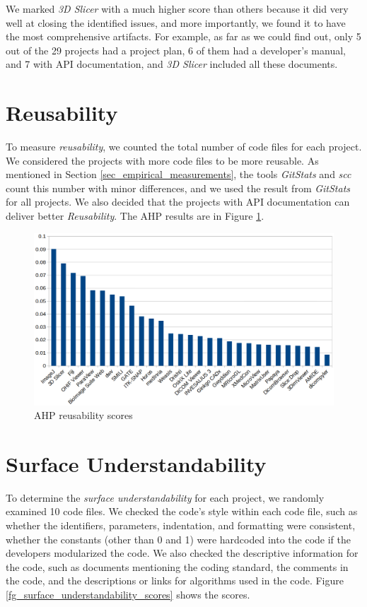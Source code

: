 We marked \textit{3D Slicer} with a much higher score than others because it did very well at closing the identified issues, and more importantly, we found it to have the most comprehensive artifacts. For example, as far as we could find out, only 5 out of the 29 projects had a project plan, 6 of them had a developer's manual, and 7 with API documentation, and \textit{3D Slicer} included all these documents.

\section{Reusability}

To measure \textit{reusability}, we counted the total number of code files for each project. We considered the projects with more code files to be more reusable. As mentioned in Section \ref{sec_empirical_measurements}, the tools \textit{GitStats} and \textit{scc} count this number with minor differences, and we used the result from \textit{GitStats} for all projects. We also decided that the projects with API documentation can deliver better \textit{Reusability}. The AHP results are in Figure \ref{fg_reusability_scores}.

\begin{figure}[H]
\includegraphics[scale=0.38]{figures/reusability_scores.png}
\caption{AHP reusability scores}
\label{fg_reusability_scores}
\end{figure}

\section{Surface Understandability}

To determine the \textit{surface understandability} for each project, we randomly examined 10 code files. We checked the code’s style within each code file, such as whether the identifiers, parameters, indentation, and formatting were consistent, whether the constants (other than 0 and 1) were hardcoded into the code if the developers modularized the code. We also checked the descriptive information for the code, such as documents mentioning the coding standard, the comments in the code, and the descriptions or links for algorithms used in the code. Figure \ref{fg_surface_understandability_scores} shows the scores.

